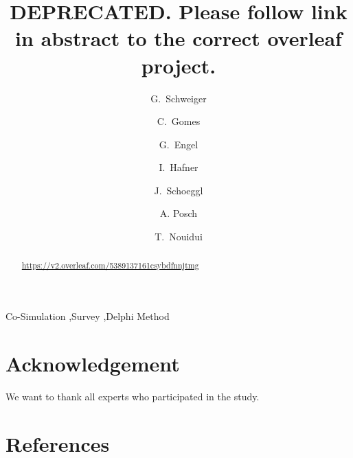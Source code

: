 \documentclass[review]{elsarticle}
\begin{document}
\begin{frontmatter}

\title{DEPRECATED. Please follow link in abstract to the correct overleaf project.}

        \author[tug]{G.~Schweiger}
        \author[ant]{C.~Gomes }
        \author[tug]{G.~Engel}
        \author[dwh]{I.~Hafner}
        \author[swe]{J.~Schoeggl}
        \author[kfu]{A. Posch}
        \author[lbnl]{T.~Nouidui }

        \address[tug]{Technical University of Graz, Austria}
        \address[ant]{University of Antwerp, Antwerp, Belgium}
        \address[dwh]{dwh GmbH - Simulation Services and Technical Solutions, Vienna, Austria}
        \address[swe]{KTH Royal Institute of Technology, Stockholm, Sweden}
        \address[kfu]{University of Graz, Austria}
        \address[lbnl]{Lawrence Berkeley National Laboratory, Berkeley, USA}



\begin{abstract}

{
\url{https://v2.overleaf.com/5389137161csybdfnnjtmg}
}


\end{abstract}

\begin{keyword}
Co-Simulation \sep Survey \sep Delphi Method
\end{keyword}

\end{frontmatter}










\section*{Acknowledgement}
We want to thank all experts who participated in the study. 
\section{References}




\newpage
\end{document}
